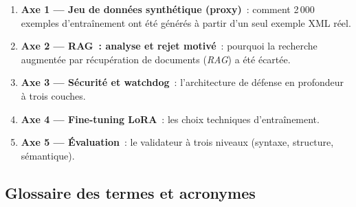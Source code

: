 \documentclass[a4paper,11pt]{article}
\newcommand{\tech}[1]{\textsl{#1}}
\begin{document}
\begin{enumerate}
    \item \textbf{Axe 1 --- Jeu de données synthétique (proxy)}~: comment
    2\,000 exemples d'entraînement ont été générés à partir d'un seul
    exemple XML réel.
    \item \textbf{Axe 2 --- RAG~: analyse et rejet motivé}~: pourquoi la
    recherche augmentée par récupération de documents (\tech{RAG}) a été
    écartée.
    \item \textbf{Axe 3 --- Sécurité et watchdog}~: l'architecture de
    défense en profondeur à trois couches.
    \item \textbf{Axe 4 --- Fine-tuning LoRA}~: les choix techniques
    d'entraînement.
    \item \textbf{Axe 5 --- Évaluation}~: le validateur à trois niveaux
    (syntaxe, structure, sémantique).
\end{enumerate}

\subsection{Glossaire des termes et acronymes}
\end{document}
